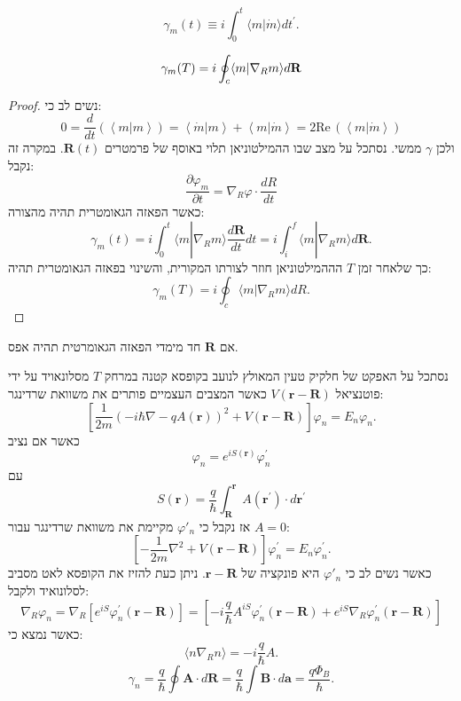 \documentclass{tstextbook}
\begin{document}
\begin{definition}
$$\gamma_{m}(t)\equiv i\int_{0}^{t}\langle m|\dot{m}\rangle d t^{\prime}.$$

\end{definition}
\begin{proposition}
$$\gamma_{m}(T)=i\oint_{c}\langle m|\nabla_{R}m\rangle d{\bf R}$$

\end{proposition}
\begin{proof}
נשים לב כי:
$$0=\frac{d}{d t}(\left<m|m\right>)=\left<\dot{m}|m\right>+\left<m|\dot{m}\right>=2\mathrm{Re}\,\left(\left<m|\dot{m}\right>\right)$$
ולכן \(\gamma\) ממשי. נסתכל על מצב שבו ההמילטוניאן תלוי באוסף של פרמטרים \(\mathbf{R}(t)\). במקרה זה נקבל:
$${\frac{\partial\varphi_{m}}{\partial t}}=\nabla_{R}\varphi\cdot{\frac{d R}{d t}}$$
כאשר הפאזה הגאומטרית תהיה מהצורה:
$$\gamma_{m}(t)=i\int_{0}^{t}\langle m|\nabla_{R}m\rangle\frac{d\mathbf{R}}{d t}d t=i\int_{i}^{f}\langle m|\nabla_{R}m\rangle d\mathbf{R}.$$
כך שלאחר זמן \(T\) הההמילטוניאן חוזר לצורתו המקורית, והשינוי בפאזה הגאומטרית תהיה:
$$\gamma_{m}(T)=i\oint_{c}\langle m|\nabla_{R}m\rangle d R.$$

\end{proof}
\begin{corollary}
אם \(\mathbf{R}\) חד מימדי הפאזה הגאומרטית תהיה אפס.

\end{corollary}
\begin{example}
נסתכל על האפקט של חלקיק טעין המאולץ לנועב בקופסא קטנה במרחק \(T\) מסלונאויד על ידי פוטנציאל \(V\left( \mathbf{r}-\mathbf{R} \right)\) כאשר המצבים העצמיים פותרים את משוואת שרדינגר:
$$\left[{\frac{1}{2m}}\left(-i\hbar\nabla-q A(\mathbf{r})\right)^{2}+V(\mathbf{r}-\mathbf{R})\right]\varphi_{n}=E_{n}\varphi_{n}.$$
כאשר אם נציב $$\varphi_{n}=e^{i S(\mathbf{r})}\varphi_{n}^{\prime}$$
עם $$S(\mathbf{r})={\frac{q}{\hbar}}\int_{\mathbf{R}}^{\mathbf{r}}A(\mathbf{r}^{\prime})\cdot d\mathbf{r}^{\prime}$$
אז נקבל כי \(\varphi'_{n}\) מקיימת את משוואת שרדינגר עבור \(A=0\):
$$\left[-\frac{1}{2m}\nabla^{2}+V(\mathbf{r}-\mathbf{R})\right]\varphi_{n}^{\prime}=E_{n}\varphi_{n}^{\prime}.$$
כאשר נשים לב כי \(\varphi'_{n}\) היא פונקציה של \(\mathbf{r-R}\). ניתן כעת להזיז את הקופסא לאט מסביב לסלונואיד ולקבל:
$$\nabla_{R}\varphi_{n}=\nabla_{R}\left[e^{i S}\varphi_{n}^{\prime}(\mathbf{r}-\mathbf{R})\right]=\left[-i{\frac{q}{\hbar}}A^{i S}\varphi_{n}^{\prime}(\mathbf{r}-\mathbf{R})+e^{i S}\nabla_{R}\varphi_{n}^{\prime}(\mathbf{r}-\mathbf{R})\right]$$
כאשר נמצא כי:
$$\langle n\nabla_{R}n\rangle=-i\frac{q}{\hbar}A.$$$$\gamma_{n}=\frac{q}{\hbar}\oint\mathbf{A}\cdot d\mathbf{R}=\frac{q}{\hbar}\int\mathbf{B}\cdot d\mathbf{a}=\frac{q\Phi_{B}}{\hbar}.$$

\end{example}
\end{document}

